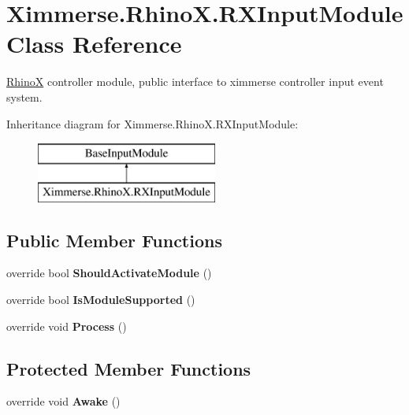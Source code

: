 \hypertarget{class_ximmerse_1_1_rhino_x_1_1_r_x_input_module}{}\section{Ximmerse.\+Rhino\+X.\+R\+X\+Input\+Module Class Reference}
\label{class_ximmerse_1_1_rhino_x_1_1_r_x_input_module}


\mbox{\hyperlink{namespace_ximmerse_1_1_rhino_x}{RhinoX}} controller module, public interface to ximmerse controller input event system.  


Inheritance diagram for Ximmerse.\+Rhino\+X.\+R\+X\+Input\+Module\+:\begin{figure}[H]
\begin{center}
\leavevmode
\includegraphics[height=2.000000cm]{class_ximmerse_1_1_rhino_x_1_1_r_x_input_module}
\end{center}
\end{figure}
\subsection*{Public Member Functions}
\begin{DoxyCompactItemize}
\item 
\mbox{\label{class_ximmerse_1_1_rhino_x_1_1_r_x_input_module_a10c2e45a017d04fe95e8ae672ca99c41}} 
override bool {\bfseries Should\+Activate\+Module} ()
\item 
\mbox{\label{class_ximmerse_1_1_rhino_x_1_1_r_x_input_module_a246990c38b35231c5b32aae3b40a826f}} 
override bool {\bfseries Is\+Module\+Supported} ()
\item 
\mbox{\label{class_ximmerse_1_1_rhino_x_1_1_r_x_input_module_a94c6f2a3ccff6bb93440417436bf6295}} 
override void {\bfseries Process} ()
\end{DoxyCompactItemize}
\subsection*{Protected Member Functions}
\begin{DoxyCompactItemize}
\item 
\mbox{\label{class_ximmerse_1_1_rhino_x_1_1_r_x_input_module_a970861dbb52ca7f297afd42bbc2638bc}} 
override void {\bfseries Awake} ()
\end{DoxyCompactItemize}
